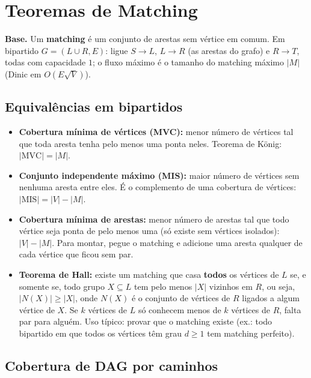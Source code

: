 \section{Teoremas de Matching}

\textbf{Base.} Um \textbf{matching} é um conjunto de arestas sem vértice em comum. Em bipartido $G = (L \cup R, E)$:
ligue $S \to L$, $L \to R$ (as arestas do grafo) e $R \to T$, todas com capacidade $1$; o fluxo máximo é o tamanho do
matching máximo $|M|$ (Dinic em $O(E\sqrt{V})$).

\subsection*{Equivalências em bipartidos}

\begin{itemize}
  \item \textbf{Cobertura mínima de vértices (MVC):} menor número de vértices tal que toda aresta tenha pelo menos
        uma ponta neles. Teorema de König: $|\text{MVC}| = |M|$.
  \item \textbf{Conjunto independente máximo (MIS):} maior número de vértices sem nenhuma aresta entre eles. É o
        complemento de uma cobertura de vértices: $|\text{MIS}| = |V| - |M|$.
  \item \textbf{Cobertura mínima de arestas:} menor número de arestas tal que todo vértice seja ponta de pelo menos
        uma (só existe sem vértices isolados): $|V| - |M|$. Para montar, pegue o matching e adicione uma aresta
        qualquer de cada vértice que ficou sem par.
  \item \textbf{Teorema de Hall:} existe um matching que casa \textbf{todos} os vértices de $L$ se, e somente se,
        todo grupo $X \subseteq L$ tem pelo menos $|X|$ vizinhos em $R$, ou seja, $|N(X)| \ge |X|$, onde $N(X)$ é o
        conjunto de vértices de $R$ ligados a algum vértice de $X$. Se $k$ vértices de $L$ só conhecem menos de $k$
        vértices de $R$, falta par para alguém. Uso típico: provar que o matching existe (ex.: todo bipartido em que
        todos os vértices têm grau $d \ge 1$ tem matching perfeito).
\end{itemize}

\subsection*{Cobertura de DAG por caminhos}

